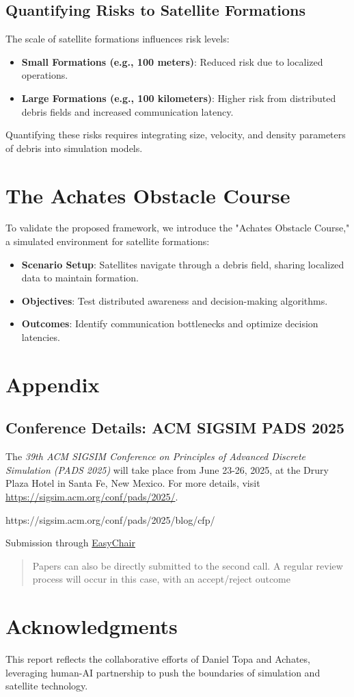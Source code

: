 \documentclass[11pt]{article}
\begin{document}
\subsection{Quantifying Risks to Satellite Formations}
The scale of satellite formations influences risk levels:
\begin{itemize}
    \item \textbf{Small Formations (e.g., 100 meters)}: Reduced risk due to localized operations.
    \item \textbf{Large Formations (e.g., 100 kilometers)}: Higher risk from distributed debris fields and increased communication latency.
\end{itemize}
Quantifying these risks requires integrating size, velocity, and density parameters of debris into simulation models.

\section{The Achates Obstacle Course}
To validate the proposed framework, we introduce the "Achates Obstacle Course," a simulated environment for satellite formations:
\begin{itemize}
    \item \textbf{Scenario Setup}: Satellites navigate through a debris field, sharing localized data to maintain formation.
    \item \textbf{Objectives}: Test distributed awareness and decision-making algorithms.
    \item \textbf{Outcomes}: Identify communication bottlenecks and optimize decision latencies.
\end{itemize}

\section*{Appendix}
\subsection*{Conference Details: ACM SIGSIM PADS 2025}
The \textit{39th ACM SIGSIM Conference on Principles of Advanced Discrete Simulation (PADS 2025)} will take place from June 23-26, 2025, at the Drury Plaza Hotel in Santa Fe, New Mexico. For more details, visit \href{https://sigsim.acm.org/conf/pads/2025/}{https://sigsim.acm.org/conf/pads/2025/}.

https://sigsim.acm.org/conf/pads/2025/blog/cfp/

Submission through \href{https://easychair.org/account2/signin?l=8243725740951894750}{EasyChair}

\begin{quotation}
Papers can also be directly submitted to the second call. A regular review process will occur in this case, with an accept/reject outcome
\end{quotation}

\section*{Acknowledgments}
This report reflects the collaborative efforts of Daniel Topa and Achates, leveraging human-AI partnership to push the boundaries of simulation and satellite technology.
\end{document}
